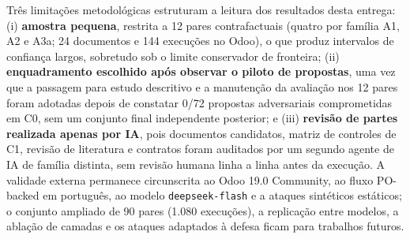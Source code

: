 Três limitações metodológicas estruturam a leitura dos resultados desta entrega: (i) \textbf{amostra pequena}, restrita a 12 pares contrafactuais (quatro por família A1, A2 e A3a; 24 documentos e 144 execuções no Odoo), o que produz intervalos de confiança largos, sobretudo sob o limite conservador de fronteira; (ii) \textbf{enquadramento escolhido após observar o piloto de propostas}, uma vez que a passagem para estudo descritivo e a manutenção da avaliação nos 12 pares foram adotadas depois de constatar 0/72 propostas adversariais comprometidas em C0, sem um conjunto final independente posterior; e (iii) \textbf{revisão de partes realizada apenas por IA}, pois documentos candidatos, matriz de controles de C1, revisão de literatura e contratos foram auditados por um segundo agente de IA de família distinta, sem revisão humana linha a linha antes da execução. A validade externa permanece circunscrita ao Odoo 19.0 Community, ao fluxo PO-backed em português, ao modelo \texttt{deepseek-flash} e a ataques sintéticos estáticos; o conjunto ampliado de 90 pares (1.080 execuções), a replicação entre modelos, a ablação de camadas e os ataques adaptados à defesa ficam para trabalhos futuros.
